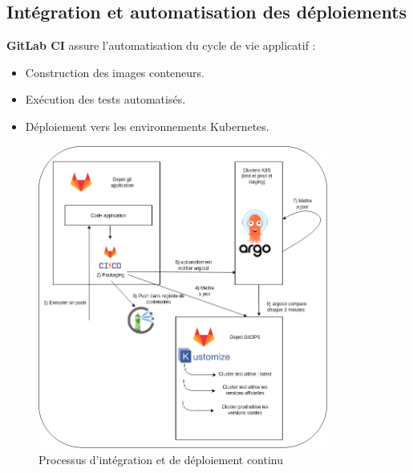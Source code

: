 \subsection{Intégration et automatisation des déploiements}

\textbf{GitLab CI} assure l'automatisation du cycle de vie applicatif :
\begin{itemize}
	\item Construction des images conteneurs.
	\item Exécution des tests automatisés.
	\item Déploiement vers les environnements Kubernetes.
\end{itemize}

\begin{figure}[H]
	\centering
	\includegraphics[width=0.85\textwidth]{figures/gitlab-ci.png}
	\caption{Processus d'intégration et de déploiement continu}
\end{figure}
